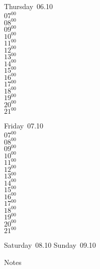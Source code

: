 \documentclass[11pt,a4paper]{book}\usepackage[]{graphicx}\usepackage[]{color}
\begin{document}
\clearpage
\begin{headerbox}
\end{headerbox}
\begin{weekdaybox}
  Thursday~06.10\\
  { 
  \vfill
  $07^{00}$\\
$08^{00}$\\
$09^{00}$\\
$10^{00}$\\
$11^{00}$\\
$12^{00}$\\
$13^{00}$\\
$14^{00}$\\
$15^{00}$\\
$16^{00}$\\
$17^{00}$\\
$18^{00}$\\
$19^{00}$\\
$20^{00}$\\
$21^{00}$\\
  }
\end{weekdaybox} 
\begin{weekdaybox}
  Friday~07.10\\
  { 
  \vfill
  $07^{00}$\\
$08^{00}$\\
$09^{00}$\\
$10^{00}$\\
$11^{00}$\\
$12^{00}$\\
$13^{00}$\\
$14^{00}$\\
$15^{00}$\\
$16^{00}$\\
$17^{00}$\\
$18^{00}$\\
$19^{00}$\\
$20^{00}$\\
$21^{00}$\\
  }
\end{weekdaybox}
\begin{weekendbox}
  Saturday~08.10
  \tcblower
  Sunday~09.10
\end{weekendbox} %
\begin{notebox}
  Notes
\end{notebox}
\clearpage
\end{document}
